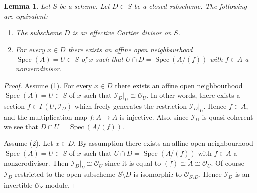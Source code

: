 \documentclass[10pt,a4paper]{amsart}
\theoremstyle{plain}
\newtheorem{lemma}[subsection]{Lemma}
\theoremstyle{definition}
\theoremstyle{remark}
\numberwithin{equation}{subsection}
\def\Spec{\mathop{\mathrm{Spec}}}
\begin{document}
\begin{lemma}
\label{lemma-characterize-effective-Cartier-divisor}
Let $S$ be a scheme.
Let $D \subset S$ be a closed subscheme.
The following are equivalent:
\begin{enumerate}
\item The subscheme $D$ is an effective Cartier divisor on $S$.
\item For every $x \in D$ there exists an affine open neighbourhood
$\Spec(A) = U \subset S$ of $x$ such that
$U \cap D = \Spec(A/(f))$ with $f \in A$ a nonzerodivisor.
\end{enumerate}
\end{lemma}

\begin{proof}
Assume (1).  For every $x \in D$ there exists an affine open neighbourhood
$\Spec(A) = U \subset S$ of $x$ such that
$\mathcal{I}_D|_U \cong \mathcal{O}_U$. In other words, there exists
a section $f \in \Gamma(U, \mathcal{I}_D)$ which freely generates the
restriction $\mathcal{I}_D|_U$. Hence $f \in A$, and the multiplication
map $f : A \to A$ is injective. Also, since $\mathcal{I}_D$ is
quasi-coherent we see that $D \cap U = \Spec(A/(f))$.

\medskip\noindent
Assume (2). Let $x \in D$. By assumption there exists an affine open
neighbourhood $\Spec(A) = U \subset S$ of $x$ such that
$U \cap D = \Spec(A/(f))$ with $f \in A$ a nonzerodivisor.
Then $\mathcal{I}_D|_U \cong \mathcal{O}_U$ since it is equal to
$\widetilde{(f)} \cong \widetilde{A} \cong \mathcal{O}_U$.
Of course $\mathcal{I}_D$ restricted to the open subscheme
$S \setminus D$ is isomorphic to $\mathcal{O}_{S \setminus D}$.
Hence $\mathcal{I}_D$ is an invertible $\mathcal{O}_S$-module.
\end{proof}
\end{document}
